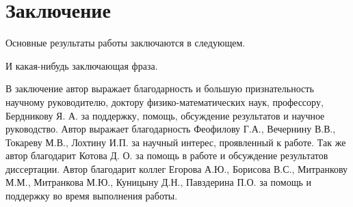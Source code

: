 \chapter*{Заключение}                       %


Основные результаты работы заключаются в следующем.

И какая-нибудь заключающая фраза.

В заключение автор выражает благодарность и большую признательность
научному руководителю, доктору физико-математических наук, профессору,
Бердникову Я. А. за поддержку, помощь, обсуждение результатов и научное
руководство. Автор выражает благодарность Феофилову Г.А., Вечернину В.В.,
Токареву М.В., Лохтину И.П. за научный интерес, проявленный к работе. Так­
же автор благодарит Котова Д. О. за помощь в работе и обсуждение результатов диссертации. Автор благодарит коллег Егорова А.Ю., Борисова В.С., Митранкову М.М., Митранкова М.Ю., Куницыну Д.Н., Павздерина П.О. за помощь и поддержку во время выполнения работы.

